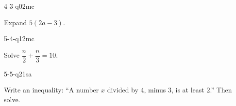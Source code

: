 \begin{practiceQuestion}{4-3-q02}{mc}
\begin{questionText}
Expand $5(2a - 3)$.
\end{questionText}
\end{practiceQuestion}

\begin{practiceQuestion}{5-4-q12}{mc}
\begin{questionText}
Solve $\dfrac{n}{2} + \dfrac{n}{3} = 10$.
\end{questionText}
\end{practiceQuestion}

\begin{practiceQuestion}{5-5-q21}{sa}
\begin{questionText}
Write an inequality: ``A number $x$ divided by $4$, minus $3$, is at least $2$.'' Then solve.
\end{questionText}
\end{practiceQuestion}

